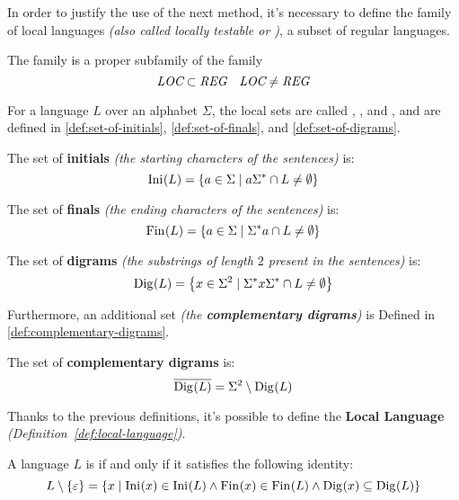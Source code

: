 \documentclass[english]{article}
\begin{document}
In order to justify the use of the next method, it's necessary to define the family of local languages \textit{(also called locally testable or \LOC)}, a subset of regular languages.

The \LOC family is a proper subfamily of the \REG family
\[ \textit{LOC} \subset \textit{REG} \quad \textit{LOC} \neq \textit{REG} \]

For a language \(L\) over an alphabet \(\Sigma\), the local sets are called \Ini, \Fin, and \Dig, and are defined in \ref{def:set-of-initials}, \ref{def:set-of-finals}, and \ref{def:set-of-digrams}.

\begin{definition}
  \label{def:set-of-initials}
  The set of \textbf{initials} \textit{(the starting characters of the sentences)} is:
  \[ \text{Ini}\hspace{0.1ex}(L) = \left\{ a \in \Sigma \mid a \Sigma^\ast \cap L \neq \emptyset \right\} \]
\end{definition}

\begin{definition}
  \label{def:set-of-finals}
  The set of \textbf{finals} \textit{(the ending characters of the sentences)} is:
  \[ \text{Fin}\hspace{0.1ex}(L) = \left\{ a \in \Sigma \mid \Sigma^\ast a \cap L \neq \emptyset \right\} \]
\end{definition}

\begin{definition}
  \label{def:set-of-digrams}
  The set of \textbf{digrams} \textit{(the substrings of length \(2\) present in the sentences)} is:
  \[ \text{Dig}\hspace{0.1ex}(L) = \left\{ x \in \Sigma^2 \mid \Sigma^\ast x \Sigma^\ast \cap L \neq \emptyset \right\} \]
\end{definition}

Furthermore, an additional set \textit{(the \textbf{complementary digrams})} is Defined in \ref{def:complementary-digrams}.

\begin{definition}
  \label{def:complementary-digrams}
  The set of \textbf{complementary digrams} is:
  \[ \overline{\text{Dig}\hspace{0.1ex}(L)} = \Sigma^2 \setminus \text{Dig}\hspace{0.1ex}(L) \]
\end{definition}

\bigskip
Thanks to the previous definitions, it's possible to define the \textbf{Local Language} \textit{(Definition~\ref{def:local-language})}.

\begin{definition}
  \label{def:local-language}
  A language \(L\) is \LOC if and only if it satisfies the following identity:
  \[ L \setminus \left\{ \varepsilon \right\} = \left\{ x \mid \text{Ini}\hspace{0.1ex}(x) \in \text{Ini}\hspace{0.1ex}(L) \land \text{Fin}\hspace{0.1ex}(x) \in \text{Fin}\hspace{0.1ex}(L) \land \text{Dig}\hspace{0.1ex}(x) \subseteq \text{Dig}\hspace{0.1ex}(L) \right\} \]
\end{definition}
\end{document}
